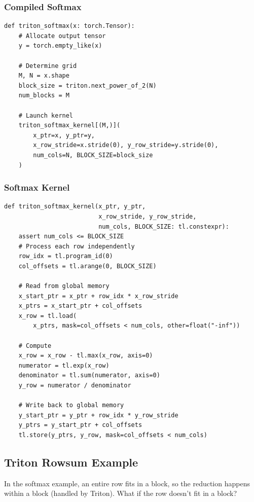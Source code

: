 \documentclass[12pt,twoside]{article}
\begin{document}
\subsubsection*{Compiled Softmax}

\begin{verbatim}
def triton_softmax(x: torch.Tensor):
    # Allocate output tensor
    y = torch.empty_like(x)
    
    # Determine grid
    M, N = x.shape                          
    block_size = triton.next_power_of_2(N)
    num_blocks = M                         
    
    # Launch kernel
    triton_softmax_kernel[(M,)](
        x_ptr=x, y_ptr=y,
        x_row_stride=x.stride(0), y_row_stride=y.stride(0),
        num_cols=N, BLOCK_SIZE=block_size
    )
\end{verbatim}

\subsubsection*{Softmax Kernel}

\begin{verbatim}
def triton_softmax_kernel(x_ptr, y_ptr, 
                          x_row_stride, y_row_stride, 
                          num_cols, BLOCK_SIZE: tl.constexpr):
    assert num_cols <= BLOCK_SIZE
    # Process each row independently
    row_idx = tl.program_id(0)
    col_offsets = tl.arange(0, BLOCK_SIZE)
    
    # Read from global memory
    x_start_ptr = x_ptr + row_idx * x_row_stride
    x_ptrs = x_start_ptr + col_offsets
    x_row = tl.load(
        x_ptrs, mask=col_offsets < num_cols, other=float("-inf"))
    
    # Compute
    x_row = x_row - tl.max(x_row, axis=0)
    numerator = tl.exp(x_row)
    denominator = tl.sum(numerator, axis=0)
    y_row = numerator / denominator
    
    # Write back to global memory
    y_start_ptr = y_ptr + row_idx * y_row_stride
    y_ptrs = y_start_ptr + col_offsets
    tl.store(y_ptrs, y_row, mask=col_offsets < num_cols)
\end{verbatim}

\subsection*{Triton Rowsum Example}

In the softmax example, an entire row fits in a block, so the reduction happens within a block (handled by Triton). What if the row doesn't fit in a block? \\
    
\end{document}
